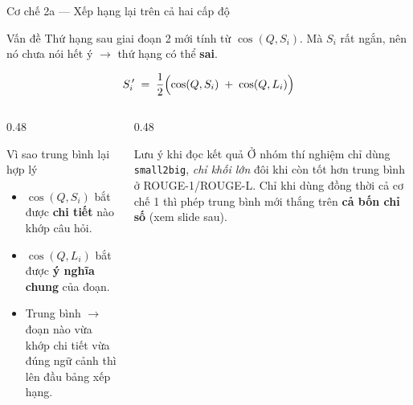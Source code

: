 \documentclass[aspectratio=169,10pt]{beamer}
\begin{document}
\begin{frame}{Cơ chế 2a --- Xếp hạng lại trên cả hai cấp độ}
  \begin{alertblock}{\small Vấn đề}
    Thứ hạng sau giai đoạn 2 mới tính từ $\cos(Q, S_i)$. Mà $S_i$ rất ngắn, nên nó chưa
    nói hết ý $\rightarrow$ thứ hạng có thể \textbf{sai}.
  \end{alertblock}
  \begin{equation*}
    S_i^{\,\prime} \;=\; \frac{1}{2}\Bigl(\cos(Q, S_i) \;+\; \cos(Q, L_i)\Bigr)
  \end{equation*}
  \vspace{0.1em}
  \begin{columns}[T]
    \begin{column}{0.48\textwidth}
      \begin{block}{\small Vì sao trung bình lại hợp lý}
        \begin{itemize}\footnotesize
          \item $\cos(Q,S_i)$ bắt được \textbf{chi tiết} nào khớp câu hỏi.
          \item $\cos(Q,L_i)$ bắt được \textbf{ý nghĩa chung} của đoạn.
          \item Trung bình $\rightarrow$ đoạn nào vừa khớp chi tiết vừa đúng ngữ cảnh
                thì lên đầu bảng xếp hạng.
        \end{itemize}
      \end{block}
    \end{column}
    \begin{column}{0.48\textwidth}
      \begin{alertblock}{\small Lưu ý khi đọc kết quả}
        \small Ở nhóm thí nghiệm chỉ dùng \texttt{small2big}, \emph{chỉ khối lớn} đôi khi
        còn tốt hơn trung bình ở ROUGE-1/ROUGE-L. Chỉ khi dùng đồng thời cả cơ chế 1
        thì phép trung bình mới thắng trên \textbf{cả bốn chỉ số} (xem slide sau).
      \end{alertblock}
    \end{column}
  \end{columns}
\end{frame}
\end{document}
